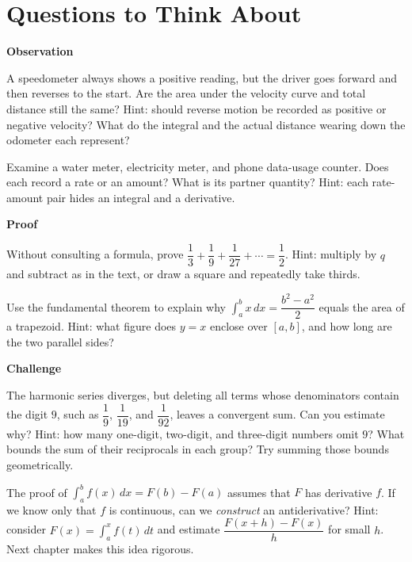 \section*{Questions to Think About}

\textbf{Observation}
\begin{sikao}
  \item A speedometer always shows a positive reading, but the driver goes forward and then reverses to the start. Are the area under the velocity curve and total distance still the same? Hint: should reverse motion be recorded as positive or negative velocity? What do the integral and the actual distance wearing down the odometer each represent?
  \item Examine a water meter, electricity meter, and phone data-usage counter. Does each record a rate or an amount? What is its partner quantity? Hint: each rate-amount pair hides an integral and a derivative.
\end{sikao}

\textbf{Proof}
\begin{sikao}
  \item Without consulting a formula, prove $\dfrac13+\dfrac19+\dfrac1{27}+\cdots=\dfrac12$. Hint: multiply by $q$ and subtract as in the text, or draw a square and repeatedly take thirds.
  \item Use the fundamental theorem to explain why $\int_a^b x\,dx=\dfrac{b^{2}-a^{2}}{2}$ equals the area of a trapezoid. Hint: what figure does $y=x$ enclose over $[a,b]$, and how long are the two parallel sides?
\end{sikao}

\textbf{Challenge}
\begin{sikao}
  \item The harmonic series diverges, but deleting all terms whose denominators contain the digit $9$, such as $\dfrac19$, $\dfrac1{19}$, and $\dfrac1{92}$, leaves a convergent sum. Can you estimate why? Hint: how many one-digit, two-digit, and three-digit numbers omit $9$? What bounds the sum of their reciprocals in each group? Try summing those bounds geometrically.
  \item The proof of $\int_a^b f(x)\,dx=F(b)-F(a)$ assumes that $F$ has derivative $f$. If we know only that $f$ is continuous, can we \emph{construct} an antiderivative? Hint: consider $F(x)=\int_a^x f(t)\,dt$ and estimate $\dfrac{F(x+h)-F(x)}{h}$ for small $h$. Next chapter makes this idea rigorous.
\end{sikao}

